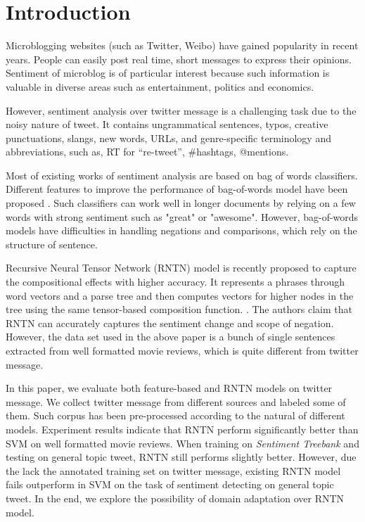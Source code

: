 \vspace{-5mm}
\section{Introduction}

Microblogging websites (such as Twitter, Weibo) have gained popularity in recent years. People can easily post real time, short messages to express their opinions. 
Sentiment of microblog is of particular interest because such information is valuable in diverse areas such as entertainment, politics and economics.

However, sentiment analysis over twitter message is a challenging task due to the noisy nature of tweet. 
It contains ungrammatical sentences, typos, creative punctuations, slangs, new words, URLs, and genre-specific terminology and abbreviations, such as, RT for “re-tweet”, \#hashtags, @mentions. 

Most of existing works of sentiment analysis are based on bag of words classifiers. Different features to improve the performance of bag-of-words model have been proposed \cite{Agarwal:2011}. Such classifiers can work well in longer documents by relying on a few words with strong sentiment such as "great" or "awesome". However, bag-of-words models have difficulties in handling negations and comparisons, which rely on the structure of sentence. 

Recursive Neural Tensor Network (RNTN) model is recently proposed to capture the compositional effects with higher accuracy. It represents a phrases through word vectors and a parse tree and then computes vectors for higher nodes in the tree using the same tensor-based composition function. \cite{Socher:2013}. The authors claim that RNTN can accurately captures the sentiment change and scope of negation. However, the data set used in the above paper is a bunch of single sentences extracted from well formatted movie reviews, which is quite different from twitter message. 

In this paper, we evaluate both feature-based and RNTN models on twitter message. We collect twitter message from different sources and labeled some of them. Such corpus has been pre-processed according to the natural of different models. Experiment results indicate that RNTN perform significantly better than SVM on well formatted movie reviews. When training on \textit{Sentiment Treebank} and testing on general topic tweet, RNTN still performs slightly better. However, due the lack the annotated training set on twitter message, existing RNTN model fails outperform in SVM on the task of sentiment detecting on general topic tweet. In the end, we explore the possibility of domain adaptation over RNTN model.  


